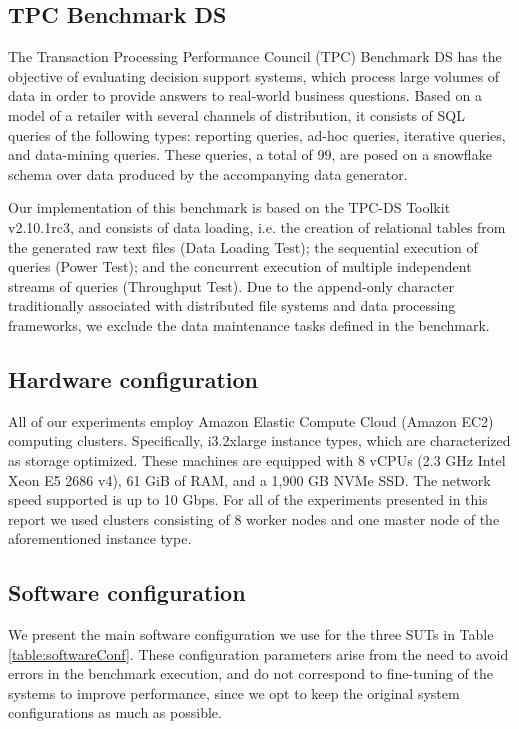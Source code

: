\subsection{TPC Benchmark DS}

The Transaction Processing Performance Council (TPC) Benchmark DS \cite{tpcdsSpec} has the objective of evaluating decision support systems, which process large volumes of data in order to provide answers to real-world business questions. Based on a model of a retailer with several channels of distribution, it consists of SQL queries of the following types: reporting queries, ad-hoc queries, iterative queries, and data-mining queries. These queries, a total of 99, are posed on a snowflake schema over data produced by the accompanying data generator.

Our implementation of this benchmark is based on the TPC-DS Toolkit v2.10.1rc3, and consists of data loading, i.e. the creation of relational tables from the generated raw text files (Data Loading Test); the sequential execution of queries (Power Test); and the concurrent execution of multiple independent streams of queries (Throughput Test). Due to the append-only character traditionally associated with distributed file systems and data processing frameworks, we exclude the data maintenance tasks defined in the benchmark.

\subsection{Hardware configuration}

All of our experiments employ Amazon Elastic Compute Cloud (Amazon EC2) computing clusters. Specifically, i3.2xlarge instance types, which are characterized as storage optimized. These machines are equipped with 8 vCPUs (2.3 GHz Intel Xeon E5 2686 v4), 61 GiB of RAM, and a 1,900 GB NVMe SSD. The network speed supported is up to 10 Gbps. For all of the experiments presented in this report we used clusters consisting of 8 worker nodes and one master node of the aforementioned instance type.

\subsection{Software configuration}\label{subsec:softwareConf}

We present the main software configuration we use for the three SUTs in Table \ref{table:softwareConf}. These configuration parameters arise from the need to avoid errors in the benchmark execution, and do not correspond to fine-tuning of the systems to improve performance, since we opt to keep the original system configurations as much as possible.

